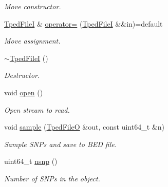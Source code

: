 \begin{DoxyCompactItemize}
\begin{DoxyCompactList}\small\item\em Move constructor. \end{DoxyCompactList}\item 
\mbox{\label{classsamp_files_1_1_tped_file_i_ab7af5b39b6248f2951b2d14bb8fafb2a}} 
\hyperlink{classsamp_files_1_1_tped_file_i}{Tped\+FileI} \& \hyperlink{classsamp_files_1_1_tped_file_i_ab7af5b39b6248f2951b2d14bb8fafb2a}{operator=} (\hyperlink{classsamp_files_1_1_tped_file_i}{Tped\+FileI} \&\&in)=default
\begin{DoxyCompactList}\small\item\em Move assignment. \end{DoxyCompactList}\item 
\mbox{\label{classsamp_files_1_1_tped_file_i_a9b3729c98ed1b6f61c50cdb274f84ddb}} 
\hyperlink{classsamp_files_1_1_tped_file_i_a9b3729c98ed1b6f61c50cdb274f84ddb}{$\sim$\+Tped\+FileI} ()
\begin{DoxyCompactList}\small\item\em Destructor. \end{DoxyCompactList}\item 
\mbox{\label{classsamp_files_1_1_tped_file_i_a8cc477538a243202af5566511dd33074}} 
void \hyperlink{classsamp_files_1_1_tped_file_i_a8cc477538a243202af5566511dd33074}{open} ()
\begin{DoxyCompactList}\small\item\em Open stream to read. \end{DoxyCompactList}\item 
void \hyperlink{classsamp_files_1_1_tped_file_i_afa47ef808ac99f8800d19f2ea0056d2e}{sample} (\hyperlink{classsamp_files_1_1_tped_file_o}{Tped\+FileO} \&out, const uint64\+\_\+t \&n)
\begin{DoxyCompactList}\small\item\em Sample S\+N\+Ps and save to B\+ED file. \end{DoxyCompactList}\item 
\mbox{\label{classsamp_files_1_1_tped_file_i_a3ed3bb51ea0681a4746c8558cd9f0ace}} 
uint64\+\_\+t \hyperlink{classsamp_files_1_1_tped_file_i_a3ed3bb51ea0681a4746c8558cd9f0ace}{nsnp} ()
\begin{DoxyCompactList}\small\item\em Number of S\+N\+Ps in the object. \end{DoxyCompactList}\item 

\end{DoxyCompactItemize}

